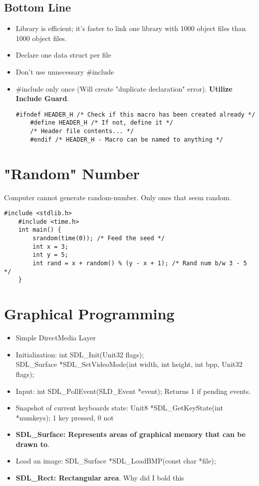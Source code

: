 \documentclass{article}
\begin{document}
\subsection{Bottom Line}
\begin{itemize}
    \item Library is efficient; it's faster to link one library with 1000 object files than 1000 object files.
    \item Declare one data struct per file
    \item Don't use unnecessary \#include
    \item \#include only once (Will create "duplicate declaration" error). \textbf{Utilize Include Guard}.
    \begin{lstlisting}[style=CStyle]
    #ifndef HEADER_H /* Check if this macro has been created already */
    #define HEADER_H /* If not, define it */
    /* Header file contents... */
    #endif /* HEADER_H - Macro can be named to anything */
    \end{lstlisting}
\end{itemize}

\section{"Random" Number}
Computer cannot generate random-number. Only ones that seem random.
\begin{lstlisting}[style=CStyle]
    #include <stdlib.h>
    #include <time.h>
    int main() {
        srandom(time(0)); /* Feed the seed */
        int x = 3;
        int y = 5;
        int rand = x + random() % (y - x + 1); /* Rand num b/w 3 - 5 */
    }
\end{lstlisting}

\section{Graphical Programming}
\begin{itemize}
    \item Simple DirectMedia Layer
    \item Initialization: int SDL\_Init(Unit32 flags);\\
    SDL\_Surface *SDL\_SetVideoMode(int width, int height, int bpp, Unit32 flags);
    \item Input: int SDL\_PollEvent(SLD\_Event *event); Returns 1 if pending events.
    \item Snapshot of current keyboards state: Unit8 *SDL\_GetKeyState(int *numkeys); 1 key pressed, 0 not
    \item \textbf{SDL\_Surface: Represents areas of graphical memory that can be drawn to}.
    \item Load an image: SDL\_Surface *SDL\_LoadBMP(const char *file);
    \item \textbf{SDL\_Rect: Rectangular area}. Why did I bold this
\end{itemize}
\end{document}

